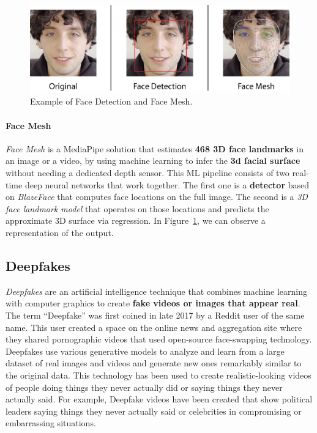 \documentclass[preprint]{elsarticle}
\begin{document}
\begin{figure}[t]
	\centering
	\includegraphics[scale=0.65, keepaspectratio]{img/background_img/MediapipeDemo.png}
	\caption{Example of Face Detection and Face Mesh.}\label{fig:MediapipeDemo}
\end{figure}


\paragraph{Face Mesh}


\emph{Face Mesh} is a MediaPipe solution that estimates \textbf{468 3D face landmarks} in an image or a video,
by using machine learning to infer the \textbf{3d facial surface} without needing a dedicated depth sensor.
This ML pipeline consists of two real-time deep neural networks that work together.
The first one is a \textbf{detector} based on \emph{BlazeFace} that computes face locations on the full image.
The second is a \emph{3D face landmark model} \cite{kartynnik2019realtime} that operates on those locations and predicts the 
approximate 3D surface via regression. In Figure~\ref{fig:MediapipeDemo}, we can observe a representation of the output.


\subsection{Deepfakes}
\emph{Deepfakes} are an artificial intelligence technique that combines machine learning with computer graphics to create \textbf{fake videos or images that appear real}. 
The term ``Deepfake'' was first coined in late 2017 by a Reddit user of the same name. 
This user created a space on the online news and aggregation site where they shared pornographic videos that used open-source face-swapping technology.
Deepfakes use various generative models to analyze and learn from a large dataset of real images and videos and generate new ones remarkably similar to the original data.
This technology has been used to create realistic-looking videos of people doing things they never actually did or saying things they never actually said. 
For example, Deepfake videos have been created that show political leaders saying things they never actually said or celebrities in compromising or embarrassing situations.
\end{document}
